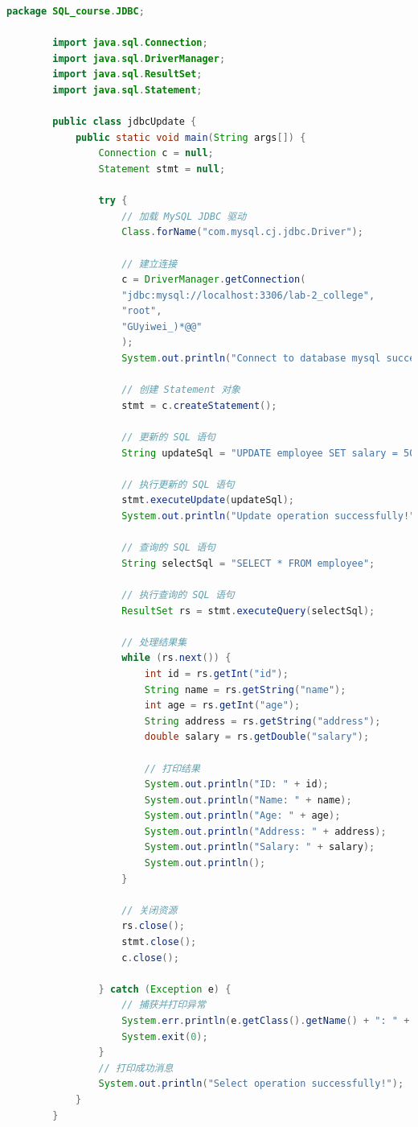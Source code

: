 \documentclass{article}
\begin{document}
	\begin{lstlisting}[language=java, title=jdbcUpdate, tabsize=4]
		package SQL_course.JDBC;
		
		import java.sql.Connection;
		import java.sql.DriverManager;
		import java.sql.ResultSet;
		import java.sql.Statement;
		
		public class jdbcUpdate {
			public static void main(String args[]) {
				Connection c = null;
				Statement stmt = null;
				
				try {
					// 加载 MySQL JDBC 驱动
					Class.forName("com.mysql.cj.jdbc.Driver");
					
					// 建立连接
					c = DriverManager.getConnection(
					"jdbc:mysql://localhost:3306/lab-2_college",
					"root",
					"GUyiwei_)*@@"
					);
					System.out.println("Connect to database mysql successfully!");
					
					// 创建 Statement 对象
					stmt = c.createStatement();
					
					// 更新的 SQL 语句
					String updateSql = "UPDATE employee SET salary = 50000.00 WHERE id = 1";
					
					// 执行更新的 SQL 语句
					stmt.executeUpdate(updateSql);
					System.out.println("Update operation successfully!");
					
					// 查询的 SQL 语句
					String selectSql = "SELECT * FROM employee";
					
					// 执行查询的 SQL 语句
					ResultSet rs = stmt.executeQuery(selectSql);
					
					// 处理结果集
					while (rs.next()) {
						int id = rs.getInt("id");
						String name = rs.getString("name");
						int age = rs.getInt("age");
						String address = rs.getString("address");
						double salary = rs.getDouble("salary");
						
						// 打印结果
						System.out.println("ID: " + id);
						System.out.println("Name: " + name);
						System.out.println("Age: " + age);
						System.out.println("Address: " + address);
						System.out.println("Salary: " + salary);
						System.out.println();
					}
					
					// 关闭资源
					rs.close();
					stmt.close();
					c.close();
					
				} catch (Exception e) {
					// 捕获并打印异常
					System.err.println(e.getClass().getName() + ": " + e.getMessage());
					System.exit(0);
				}
				// 打印成功消息
				System.out.println("Select operation successfully!");
			}
		}
		
	\end{lstlisting}
	
\end{document}
